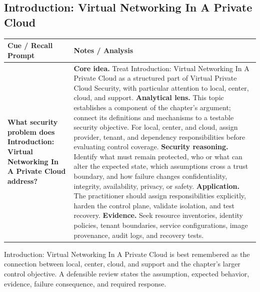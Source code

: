 \documentclass[11pt]{article}
\newcommand{\CornellHeader}{%
\rowcolor{Navy}\color{white}\bfseries Cue / Recall Prompt & \color{white}\bfseries Notes / Analysis\\\hline}
\newcommand{\CornellRow}[2]{%
\cellcolor{CueGray}\RaggedRight\textbf{#1} & \RaggedRight #2\\\hline}
\begin{document}
\subsection*{Introduction: Virtual Networking In A Private Cloud}
\begin{longtable}{>{\RaggedRight\arraybackslash}p{}|>{\RaggedRight\arraybackslash}p{}}
\CornellHeader
\CornellRow{What security problem does Introduction: Virtual Networking In A Private Cloud address?}{\textbf{Core idea.} Treat Introduction: Virtual Networking In A Private Cloud as a structured part of Virtual Private Cloud Security, with particular attention to local, center, cloud, and support. \textbf{Analytical lens.} This topic establishes a component of the chapter's argument; connect its definitions and mechanisms to a testable security objective. For local, center, and cloud, assign provider, tenant, and dependency responsibilities before evaluating control coverage. \textbf{Security reasoning.} Identify what must remain protected, who or what can alter the expected state, which assumptions cross a trust boundary, and how failure changes confidentiality, integrity, availability, privacy, or safety. \textbf{Application.} The practitioner should assign responsibilities explicitly, harden the control plane, validate isolation, and test recovery. \textbf{Evidence.} Seek resource inventories, identity policies, tenant boundaries, service configurations, image provenance, audit logs, and recovery tests.}
\end{longtable}
\begin{topicsummary}
Introduction: Virtual Networking In A Private Cloud is best remembered as the connection between local, center, cloud, and support and the chapter's larger control objective. A defensible review states the assumption, expected behavior, evidence, failure consequence, and required response.
\end{topicsummary}
\end{document}
